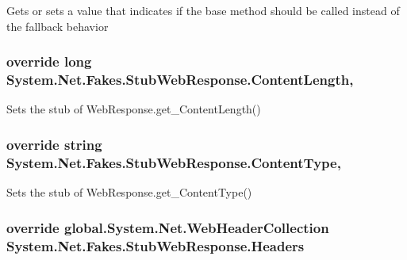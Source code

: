 Gets or sets a value that indicates if the base method should be called instead of the fallback behavior

\hypertarget{class_system_1_1_net_1_1_fakes_1_1_stub_web_response_a3942bf9d328579a4b16f1a66bea54103}{
\subsubsection[{Content\-Length}]{\setlength{\rightskip}{0pt plus 5cm}override long System.\-Net.\-Fakes.\-Stub\-Web\-Response.\-Content\-Length\hspace{0.3cm}{\ttfamily [get]}, {\ttfamily [set]}}}\label{class_system_1_1_net_1_1_fakes_1_1_stub_web_response_a3942bf9d328579a4b16f1a66bea54103}


Sets the stub of Web\-Response.\-get\-\_\-\-Content\-Length()

\hypertarget{class_system_1_1_net_1_1_fakes_1_1_stub_web_response_ad4ba405aa10a84da985d59882b919ada}{
\subsubsection[{Content\-Type}]{\setlength{\rightskip}{0pt plus 5cm}override string System.\-Net.\-Fakes.\-Stub\-Web\-Response.\-Content\-Type\hspace{0.3cm}{\ttfamily [get]}, {\ttfamily [set]}}}\label{class_system_1_1_net_1_1_fakes_1_1_stub_web_response_ad4ba405aa10a84da985d59882b919ada}


Sets the stub of Web\-Response.\-get\-\_\-\-Content\-Type()

\hypertarget{class_system_1_1_net_1_1_fakes_1_1_stub_web_response_ad79686007fec913c3a73690ed92b8788}{
\subsubsection[{Headers}]{\setlength{\rightskip}{0pt plus 5cm}override global.\-System.\-Net.\-Web\-Header\-Collection System.\-Net.\-Fakes.\-Stub\-Web\-Response.\-Headers\hspace{0.3cm}{\ttfamily [get]}}}\label{class_system_1_1_net_1_1_fakes_1_1_stub_web_response_ad79686007fec913c3a73690ed92b8788}



